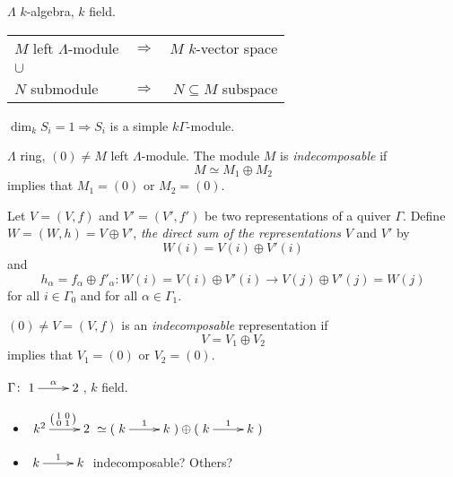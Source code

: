 \begin{recall}
$\Lambda$ $k$-algebra, $k$ field.

\begin{tabular}{lcr}
$M$ left $\Lambda$-module & $\Rightarrow$ & $M$ $k$-vector space\\
 $\cup$ & & \\
$N$ submodule & $\Rightarrow$ & $N\subseteq M$ subspace
\end{tabular}
\end{recall}
\begin{note}
$\dim_k S_i = 1 \Rightarrow S_i$ is a simple $k\Gamma$-module.
\end{note}
\begin{defin}
$\Lambda$ ring, $(0)\neq M$ left $\Lambda$-module.  The module $M$ is
\emph{indecomposable} if 
\[M\simeq M_1\oplus M_2\]
implies that $M_1=(0)$ or $M_2 = (0)$.
\end{defin}
\begin{defin}
Let $V = (V,f)$ and $V' = (V',f')$ be two representations of a quiver
$\Gamma$. Define $W = (W,h) = V \oplus V'$, \emph{the direct sum of
  the representations} $V$ and $V'$ by 
\[W(i) = V(i) \oplus V'(i)\]
and
\[h_\alpha = f_\alpha\oplus f'_\alpha \colon W(i) = V(i)\oplus
  V'(i)\to V(j)\oplus V'(j) = W(j)\]
for all $i\in \Gamma_0$ and for all $\alpha\in\Gamma_1$. 
\end{defin}

\begin{defin}
$(0)\neq V = (V,f)$ is an
\emph{indecomposable}
representation if 
\[V = V_1\oplus V_2\]
implies that $V_1=(0)$ or $V_2 = (0)$. 
\end{defin}

\begin{exam}
$\Gamma\colon \xymatrix{1\ar[r]^\alpha & 2}$, $k$ field.

\begin{itemize}
\item $\xymatrix{k^2\ar[r]^{\left(\begin{smallmatrix}1 & 0 \\ 0 &
          1\end{smallmatrix}\right)} & 2}
\simeq (\xymatrix{k\ar[r]^1 & k})\oplus (\xymatrix{k\ar[r]^1 & k})$
\item $\xymatrix{k\ar[r]^1 & k}$ indecomposable? Others?
\end{itemize}
\end{exam}

